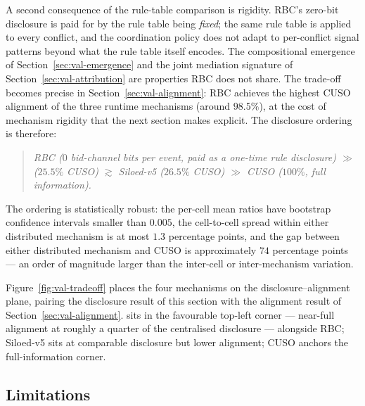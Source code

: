 A second consequence of the rule-table comparison is rigidity. RBC's
zero-bit disclosure is paid for by the rule table being \emph{fixed};
the same rule table is applied to every conflict, and the
coordination policy does not adapt to per-conflict signal patterns
beyond what the rule table itself encodes. The compositional
emergence of Section~\ref{sec:val-emergence} and the joint mediation
signature of Section~\ref{sec:val-attribution} are properties RBC
does not share. The trade-off becomes precise in
Section~\ref{sec:val-alignment}: RBC achieves the highest CUSO
alignment of the three runtime mechanisms (around $98.5\%$), at the
cost of mechanism rigidity that the next section makes explicit.
The disclosure ordering is therefore:

\begin{quote}
\itshape
RBC ($0$ bid-channel bits per event, paid as a one-time rule
disclosure) \;$\gg$\; \NEXUS{} ($25.5\%$ CUSO) \;$\gtrsim$\;
Siloed-v5 ($26.5\%$ CUSO) \;$\gg$\; CUSO ($100\%$, full
information).
\end{quote}

The ordering is statistically robust: the per-cell mean ratios have
bootstrap confidence intervals smaller than $0.005$, the cell-to-cell
spread within either distributed mechanism is at most $1.3$
percentage points, and the gap between either distributed mechanism
and CUSO is approximately $74$ percentage points --- an order of
magnitude larger than the inter-cell or inter-mechanism variation.

Figure~\ref{fig:val-tradeoff} places the four mechanisms on the
disclosure--alignment plane, pairing the disclosure result of this
section with the alignment result of Section~\ref{sec:val-alignment}.
\NEXUS{} sits in the favourable top-left corner --- near-full
alignment at roughly a quarter of the centralised disclosure ---
alongside RBC; Siloed-v5 sits at comparable disclosure but lower
alignment; CUSO anchors the full-information corner.


\subsection*{Limitations}


